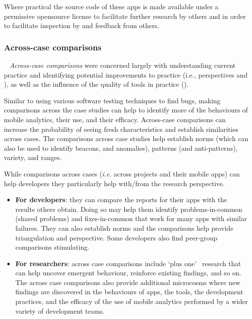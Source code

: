 Where practical the source code of these apps is made available under a permissive opensource license to facilitate further research by others and in order to facilitate inspection by and feedback from others.



\subsubsection{Across-case comparisons}~\label{across-case-comparisons-research-method}
\textit{Across-case comparisons} were concerned largely with understanding current practice and identifying potential improvements to practice (i.e., perspectives \uuse and \iuse), as well as the influence of the quality of tools in practice (\itools).

Similar to using various software testing techniques to find bugs, making comparisons across the case studies can help to identify more of the behaviours of mobile analytics, their use, and their efficacy. Across-case comparisons can increase the probability of seeing fresh characteristics and establish similarities across cases. The comparisons across case studies help establish norms (which can also be used to identify beacons, and anomalies), patterns (and anti-patterns), variety, and ranges. 

While comparisons across cases (\textit{i.e.} across projects and their mobile apps) can help developers they particularly help with/from the research perspective.

\begin{itemize}
    \item \textbf{For developers}: they can compare the reports for their apps with the results others obtain. Doing so may help them identify problems-in-common (shared problems) and fixes-in-common that work for many apps with similar failures. They can also establish norms and the comparisons help provide triangulation and perspective. Some developers also find peer-group comparisons stimulating.
    
    \item \textbf{For researchers}: across case comparisons include `plus one'~\citep[pp 28-29]{aurini2016_how_to_of_qualitative_research} research that can help uncover emergent behaviour, reinforce existing findings, and so on. The across case comparisons also provide additional microcosms where new findings are discovered in the behaviours of apps, the tools, the development practices, and the efficacy of the use of mobile analytics performed by a wider variety of development teams.
\end{itemize}

